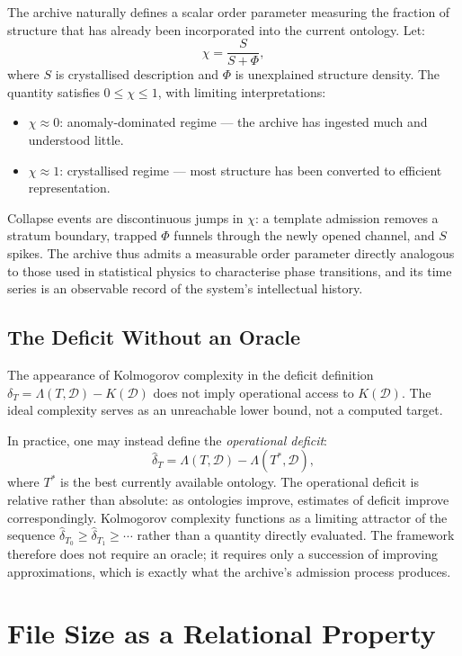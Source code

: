 \documentclass[11pt, a4paper, openany]{book}
\theoremstyle{plain}
\theoremstyle{definition}
\theoremstyle{remark}
\begin{document}
The archive naturally defines a scalar order parameter measuring the fraction
of structure that has already been incorporated into the current ontology.
Let:
\[
  \chi = \frac{S}{S + \Phi},
\]
where $S$ is crystallised description and $\Phi$ is unexplained structure density.
The quantity satisfies $0 \leq \chi \leq 1$, with limiting interpretations:
\begin{itemize}
  \item $\chi \approx 0$: anomaly-dominated regime --- the archive has ingested
    much and understood little.
  \item $\chi \approx 1$: crystallised regime --- most structure has been
    converted to efficient representation.
\end{itemize}
Collapse events are discontinuous jumps in $\chi$: a template admission removes
a stratum boundary, trapped $\Phi$ funnels through the newly opened channel,
and $S$ spikes.
The archive thus admits a measurable order parameter directly analogous to
those used in statistical physics to characterise phase transitions, and its
time series is an observable record of the system's intellectual history.

\subsection{The Deficit Without an Oracle}

The appearance of Kolmogorov complexity in the deficit definition
$\delta_T = \Lambda(T, \mathcal{D}) - K(\mathcal{D})$ does not imply
operational access to $K(\mathcal{D})$.
The ideal complexity serves as an unreachable lower bound, not a computed target.

In practice, one may instead define the \emph{operational deficit}:
\[
  \hat{\delta}_T = \Lambda(T, \mathcal{D}) - \Lambda(T^*, \mathcal{D}),
\]
where $T^*$ is the best currently available ontology.
The operational deficit is relative rather than absolute: as ontologies improve,
estimates of deficit improve correspondingly.
Kolmogorov complexity functions as a limiting attractor of the sequence
$\hat{\delta}_{T_0} \geq \hat{\delta}_{T_1} \geq \cdots$
rather than a quantity directly evaluated.
The framework therefore does not require an oracle; it requires only a
succession of improving approximations, which is exactly what the archive's
admission process produces.

\section{File Size as a Relational Property}
\end{document}
